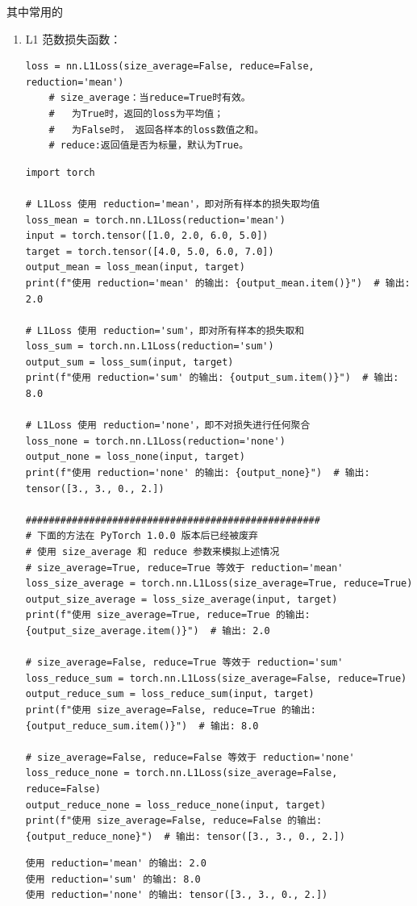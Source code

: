 其中常用的
\begin{enumerate}[label=\arabic*)]
    \item L1 范数损失函数：
    \begin{lstlisting}[style=demostyle,numbers=none] 
    loss = nn.L1Loss(size_average=False, reduce=False, reduction='mean')
    # size_average：当reduce=True时有效。
    #   为True时，返回的loss为平均值；
    #   为False时， 返回各样本的loss数值之和。
    # reduce:返回值是否为标量，默认为True。
    \end{lstlisting}
\begin{lstlisting}[style=pythonstyle]
import torch

# L1Loss 使用 reduction='mean'，即对所有样本的损失取均值
loss_mean = torch.nn.L1Loss(reduction='mean')
input = torch.tensor([1.0, 2.0, 6.0, 5.0])
target = torch.tensor([4.0, 5.0, 6.0, 7.0])
output_mean = loss_mean(input, target)
print(f"使用 reduction='mean' 的输出: {output_mean.item()}")  # 输出: 2.0

# L1Loss 使用 reduction='sum'，即对所有样本的损失取和
loss_sum = torch.nn.L1Loss(reduction='sum')
output_sum = loss_sum(input, target)
print(f"使用 reduction='sum' 的输出: {output_sum.item()}")  # 输出: 8.0

# L1Loss 使用 reduction='none'，即不对损失进行任何聚合
loss_none = torch.nn.L1Loss(reduction='none')
output_none = loss_none(input, target)
print(f"使用 reduction='none' 的输出: {output_none}")  # 输出: tensor([3., 3., 0., 2.])

###################################################
# 下面的方法在 PyTorch 1.0.0 版本后已经被废弃
# 使用 size_average 和 reduce 参数来模拟上述情况
# size_average=True, reduce=True 等效于 reduction='mean'
loss_size_average = torch.nn.L1Loss(size_average=True, reduce=True)
output_size_average = loss_size_average(input, target)
print(f"使用 size_average=True, reduce=True 的输出: {output_size_average.item()}")  # 输出: 2.0

# size_average=False, reduce=True 等效于 reduction='sum'
loss_reduce_sum = torch.nn.L1Loss(size_average=False, reduce=True)
output_reduce_sum = loss_reduce_sum(input, target)
print(f"使用 size_average=False, reduce=True 的输出: {output_reduce_sum.item()}")  # 输出: 8.0

# size_average=False, reduce=False 等效于 reduction='none'
loss_reduce_none = torch.nn.L1Loss(size_average=False, reduce=False)
output_reduce_none = loss_reduce_none(input, target)
print(f"使用 size_average=False, reduce=False 的输出: {output_reduce_none}")  # 输出: tensor([3., 3., 0., 2.])
\end{lstlisting}
\begin{lstlisting}[style=demostyle,numbers=none]
使用 reduction='mean' 的输出: 2.0
使用 reduction='sum' 的输出: 8.0
使用 reduction='none' 的输出: tensor([3., 3., 0., 2.])


\end{lstlisting}
\end{enumerate}
